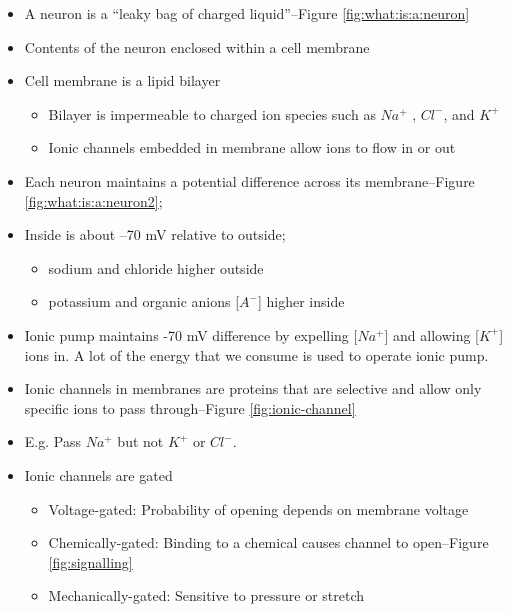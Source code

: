 \documentclass[]{article}
\begin{document}
\begin{itemize}
	\item  A neuron is a ``leaky bag of charged liquid''--Figure \ref{fig:what:is:a:neuron}
	\item Contents of the neuron enclosed within a cell membrane
	\item Cell membrane is a lipid bilayer
	\begin{itemize}
		\item Bilayer is impermeable to charged ion species such as $Na^+$ , $Cl^-$, and $K^+$
		\item Ionic channels embedded in membrane allow ions to flow in or out
	\end{itemize}
	\item Each neuron maintains a potential difference across its membrane--Figure \ref{fig:what:is:a:neuron2};
	\item Inside is about –70 mV relative to outside;
	\begin{itemize}
		\item sodium and chloride higher outside
		\item potassium and organic anions [$A^-$] higher inside
	\end{itemize}
	\item Ionic pump maintains -70 mV difference by expelling [$Na^+$] 
	and allowing [$K^+$] ions in. A lot of the energy that we consume is used to operate ionic pump.
	\item Ionic channels in membranes are proteins that are selective and allow only specific ions to pass through--Figure \ref{fig:ionic-channel}
	\item E.g. Pass $Na^+$ but not $K^+$ or $Cl^-$.
	\item Ionic channels are gated
	\begin{itemize}
		\item Voltage-gated: Probability of opening depends on membrane voltage
		\item Chemically-gated: Binding to a chemical causes channel to open--Figure \ref{fig:signalling}
		\item Mechanically-gated: Sensitive to 	pressure or stretch
	\end{itemize}
\end{itemize}
\end{document}
